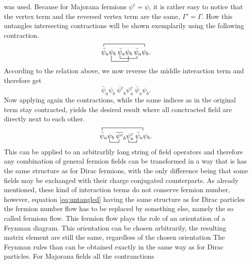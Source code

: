 was used.
Because for Majorana fermions $\psi^c=\psi$, it is rather easy to notice that the vertex term and the reversed vertex term are the same, $\Gamma'=\Gamma$. \newline\indent
How this untangles intersecting contractions will be shown exemplarily using the following contraction.
\begin{equation*}
	\contraction{}{\bar{\psi}}{{_a\psi_b\:\bar{\psi}_a\psi_b\:\bar{\psi}_a}}{\psi}
	\bcontraction[2ex]{\bar{\psi}_a}{\psi}{{}_b\:\bar{\psi}_a}{\psi}
	\bcontraction{\bar{\psi}_a\psi_b\:}{\bar{\psi}}{{}_a\psi_b\:}{\bar{\psi}}
	\bar{\psi}_a\psi_b\:\bar{\psi}_a\psi_b\:\bar{\psi}_a\psi_b.
\end{equation*}
According to the relation above, we now reverse the middle interaction term and therefore get
\begin{equation*}
	\bar{\psi}_a\psi_b\:\overline{\psi^c}_b\psi^c_a\:\bar{\psi}_a\psi_b.
\end{equation*}
Now applying again the contractions, while the same indices as in the original term stay contracted, yields the desired result where all conctracted field are directly next to each other. 
\begin{equation}
\contraction{}{\bar{\psi}}{{_a\psi_b\:\bar{\psi}_a\psi_b\:\bar{\psi}_a}}{\psi}
\bcontraction{\bar{\psi}_a}{\psi}{{}_b\:}{\psi}
\bcontraction{\bar{\psi}_a\psi_b\:\overline{\psi^c}_b}{\bar{\psi}}{{}_a}{\bar{\psi}}
\bar{\psi}_a\psi_b\:\overline{\psi^c}_b\psi^c_a\:\bar{\psi}_a\psi_b.
\label{eq:untangled}
\end{equation}
This can be applied to an arbitrarlily long string of field operators and therefore any combination of general fermion fields can be transformed in a way that is has the same structure as for Dirac fermions, with the only difference being that some fields may be exchanged with their charge conjugated counterparts. As already mentioned, these kind of interaction terms do not conserve fermion number, however, equation \eqref{eq:untangled} having the same structure as for Dirac particles the fermion number flow has to be replaced by something else, namely the so called fermiom flow. This fermion flow plays the role of an orientation of a Feynman diagram. This orientation can be chosen arbitrarily, the resulting matrix element are still the same, regardless of the chosen orientation\cite[p. 474]{Denner:1992vza}\newline\indent 
The Feynman rules than can be obtained exactly in the same way as for Dirac particles. For Majorana fields all the contranctions 
